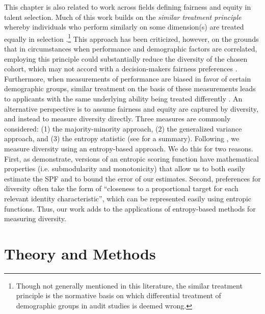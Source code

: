 This chapter is also related to work across fields defining fairness and equity in talent selection. Much of this work builds on the \emph{similar treatment principle} whereby individuals who perform similarly on some dimension(s) are treated equally in selection \cite{dwork_fairness_2012}.\footnote{Though not generally mentioned in this literature, the similar treatment principle is the normative basis on which differential treatment of demographic groups in audit studies is deemed wrong.} This approach has been criticized, however, on the grounds that in circumstances when performance and demographic factors are correlated, employing this principle could substantially reduce the diversity of the chosen cohort, which may not accord with a decision-makers fairness preferences \cite{fleisher_whats_nodate}. Furthermore, when measurements of performance are biased in favor of certain demographic groups, similar treatment on the basis of these measurements leads to applicants with the same underlying ability being treated differently \cite{fleisher_whats_nodate}. An alternative perspective is to assume fairness and equity are captured by diversity, and instead to measure diversity directly. Three measures are commonly considered: (1) the majority-minority approach, (2) the generalized variance approach, and (3) the entropy statistic (see \textcite{budescu2012measure} for a summary). Following \textcite{huppenkothen2020entrofy}, we measure diversity using an entropy-based approach. We do this for two reasons. First, as \textcite{huppenkothen2020entrofy} demonstrate, versions of an entropic scoring function have mathematical properties (i.e. submodularity and monotonicity) that allow us to both easily estimate the SPF and to bound the error of our estimates. Second, preferences for diversity often take the form of ``closeness to a proportional target for each relevant identity characteristic'', which can be represented easily using entropic functions. Thus, our work adds to the applications of entropy-based methods for measuring diversity.

\section{Theory and Methods}\label{sec:spfmethod}
